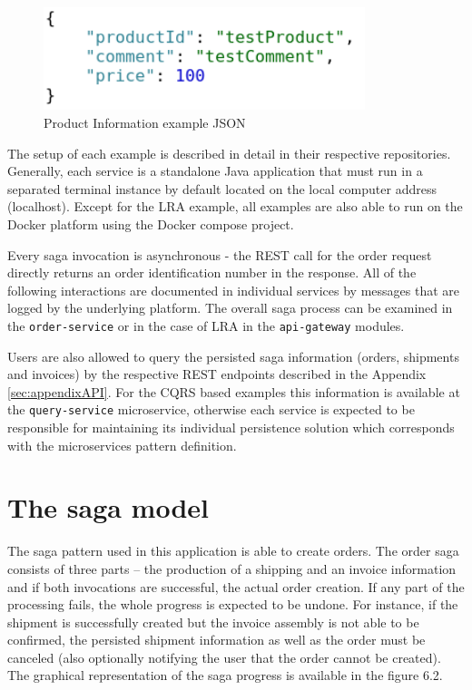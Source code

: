 \documentclass[oneside,
  digital, %
  table,   %
  nolof,     %
  nolot,     %
]{fithesis3}
\begin{document}
\begin{figure}
    \begin{center}
        \includegraphics[height=30mm]{images/productInfoJSON.png}
    \end{center}
    \caption{Product Information example JSON}
    \label{fig:inputJson}
\end{figure}

The setup of each example is described in detail in their respective repositories. Generally, each service is a standalone Java application that must run in a separated terminal instance by default located on the local computer address (localhost). Except for the LRA example, all examples are also able to run on the Docker\cite{docker} platform using the Docker compose project\cite{docker_compose}.

Every saga invocation is asynchronous - the REST call for the order request directly returns an order identification number in the response. All of the following interactions are documented in individual services by messages that are logged by the underlying platform. The overall saga process can be examined in the \texttt{order-service} or in the case of LRA in the \texttt{api-gateway} modules.

Users are also allowed to query the persisted saga information (orders, shipments and invoices) by the respective REST endpoints described in the Appendix \ref{sec:appendixAPI}. For the CQRS based examples this information is available at the \texttt{query-service} microservice, otherwise each service is expected to be responsible for maintaining its individual persistence solution which corresponds with the microservices pattern definition.

\section{The saga model}

The saga pattern used in this application is able to create orders. The order saga consists of three parts -- the production of a shipping and an invoice information and if both invocations are successful, the actual order creation. If any part of the processing fails, the whole progress is expected to be undone. For instance, if the shipment is successfully created but the invoice assembly is not able to be confirmed, the persisted shipment information as well as the order must be canceled (also optionally notifying the user that the order cannot be created). The graphical representation of the saga progress is available in the figure 6.2.
\end{document}
